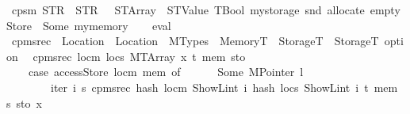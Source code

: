 \begin{isabellebody}
\ {\isachardoublequoteopen}cps{}m\ {\isacharparenleft}{\kern0pt}STR\ {\isacharprime}{\kern0pt}{\isacharprime}{\kern0pt}{}{\isacharprime}{\kern0pt}{\isacharprime}{\kern0pt}{\isacharparenright}{\kern0pt}\ {\isacharparenleft}{\kern0pt}STR\ {\isacharprime}{\kern0pt}{\isacharprime}{\kern0pt}{}{\isacharprime}{\kern0pt}{\isacharprime}{\kern0pt}{\isacharparenright}{\kern0pt}\ {}\ {\isacharparenleft}{\kern0pt}STArray\ {}\ {\isacharparenleft}{\kern0pt}STValue\ TBool{\isacharparenright}{\kern0pt}{\isacharparenright}{\kern0pt}\ mystorage{}\ {\isacharparenleft}{\kern0pt}snd\ {\isacharparenleft}{\kern0pt}allocate\ emptyStore{\isacharparenright}{\kern0pt}{\isacharparenright}{\kern0pt}\ {\isacharequal}{\kern0pt}\ Some\ mymemory{\isachardoublequoteclose}\isanewline
%
\isadelimproof
\ \ %
\endisadelimproof
%
\isatagproof
{}\isamarkupfalse%
\ eval%
\endisatagproof
{\isafoldproof}%
%
\isadelimproof
%
\endisadelimproof
%
\isadelimdocument
%
\endisadelimdocument
%
\isatagdocument
%
\isamarkuptrue%
%
\isamarkuptrue%
%
\endisatagdocument
{\isafolddocument}%
%
\isadelimdocument
%
\endisadelimdocument
{}\isamarkupfalse%
\ cpm{}srec\ {\isacharcolon}{\kern0pt}{\isacharcolon}{\kern0pt}\ {\isachardoublequoteopen}Location\ {\isasymRightarrow}\ Location\ {\isasymRightarrow}\ MTypes\ {\isasymRightarrow}\ MemoryT\ {\isasymRightarrow}\ StorageT\ {\isasymRightarrow}\ StorageT\ option{\isachardoublequoteclose}\isanewline
{}\isanewline
\ \ {\isachardoublequoteopen}cpm{}srec\ locm\ locs\ {\isacharparenleft}{\kern0pt}MTArray\ x\ t{\isacharparenright}{\kern0pt}\ mem\ sto\ {\isacharequal}{\kern0pt}\isanewline
\ \ \ \ {\isacharparenleft}{\kern0pt}case\ accessStore\ locm\ mem\ of\isanewline
\ \ \ \ \ \ Some\ {\isacharparenleft}{\kern0pt}MPointer\ l{\isacharparenright}{\kern0pt}\ {\isasymRightarrow}\isanewline
\ \ \ \ \ \ \ \ iter{\isacharprime}{\kern0pt}\ {\isacharparenleft}{\kern0pt}{\isasymlambda}i\ s{\isacharprime}{\kern0pt}{\isachardot}{\kern0pt}\ cpm{}srec\ {\isacharparenleft}{\kern0pt}hash\ locm\ {\isacharparenleft}{\kern0pt}ShowL\isactrlsub i\isactrlsub n\isactrlsub t\ i{\isacharparenright}{\kern0pt}{\isacharparenright}{\kern0pt}\ {\isacharparenleft}{\kern0pt}hash\ locs\ {\isacharparenleft}{\kern0pt}ShowL\isactrlsub i\isactrlsub n\isactrlsub t\ i{\isacharparenright}{\kern0pt}{\isacharparenright}{\kern0pt}\ t\ mem\ s{\isacharprime}{\kern0pt}{\isacharparenright}{\kern0pt}\ sto\ x\isanewline

\end{isabellebody}
